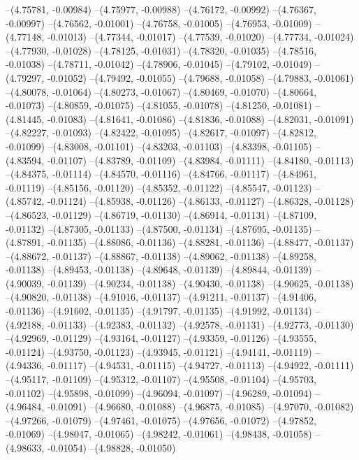 --(4.75781, -0.00984)
--(4.75977, -0.00988)
--(4.76172, -0.00992)
--(4.76367, -0.00997)
--(4.76562, -0.01001)
--(4.76758, -0.01005)
--(4.76953, -0.01009)
--(4.77148, -0.01013)
--(4.77344, -0.01017)
--(4.77539, -0.01020)
--(4.77734, -0.01024)
--(4.77930, -0.01028)
--(4.78125, -0.01031)
--(4.78320, -0.01035)
--(4.78516, -0.01038)
--(4.78711, -0.01042)
--(4.78906, -0.01045)
--(4.79102, -0.01049)
--(4.79297, -0.01052)
--(4.79492, -0.01055)
--(4.79688, -0.01058)
--(4.79883, -0.01061)
--(4.80078, -0.01064)
--(4.80273, -0.01067)
--(4.80469, -0.01070)
--(4.80664, -0.01073)
--(4.80859, -0.01075)
--(4.81055, -0.01078)
--(4.81250, -0.01081)
--(4.81445, -0.01083)
--(4.81641, -0.01086)
--(4.81836, -0.01088)
--(4.82031, -0.01091)
--(4.82227, -0.01093)
--(4.82422, -0.01095)
--(4.82617, -0.01097)
--(4.82812, -0.01099)
--(4.83008, -0.01101)
--(4.83203, -0.01103)
--(4.83398, -0.01105)
--(4.83594, -0.01107)
--(4.83789, -0.01109)
--(4.83984, -0.01111)
--(4.84180, -0.01113)
--(4.84375, -0.01114)
--(4.84570, -0.01116)
--(4.84766, -0.01117)
--(4.84961, -0.01119)
--(4.85156, -0.01120)
--(4.85352, -0.01122)
--(4.85547, -0.01123)
--(4.85742, -0.01124)
--(4.85938, -0.01126)
--(4.86133, -0.01127)
--(4.86328, -0.01128)
--(4.86523, -0.01129)
--(4.86719, -0.01130)
--(4.86914, -0.01131)
--(4.87109, -0.01132)
--(4.87305, -0.01133)
--(4.87500, -0.01134)
--(4.87695, -0.01135)
--(4.87891, -0.01135)
--(4.88086, -0.01136)
--(4.88281, -0.01136)
--(4.88477, -0.01137)
--(4.88672, -0.01137)
--(4.88867, -0.01138)
--(4.89062, -0.01138)
--(4.89258, -0.01138)
--(4.89453, -0.01138)
--(4.89648, -0.01139)
--(4.89844, -0.01139)
--(4.90039, -0.01139)
--(4.90234, -0.01138)
--(4.90430, -0.01138)
--(4.90625, -0.01138)
--(4.90820, -0.01138)
--(4.91016, -0.01137)
--(4.91211, -0.01137)
--(4.91406, -0.01136)
--(4.91602, -0.01135)
--(4.91797, -0.01135)
--(4.91992, -0.01134)
--(4.92188, -0.01133)
--(4.92383, -0.01132)
--(4.92578, -0.01131)
--(4.92773, -0.01130)
--(4.92969, -0.01129)
--(4.93164, -0.01127)
--(4.93359, -0.01126)
--(4.93555, -0.01124)
--(4.93750, -0.01123)
--(4.93945, -0.01121)
--(4.94141, -0.01119)
--(4.94336, -0.01117)
--(4.94531, -0.01115)
--(4.94727, -0.01113)
--(4.94922, -0.01111)
--(4.95117, -0.01109)
--(4.95312, -0.01107)
--(4.95508, -0.01104)
--(4.95703, -0.01102)
--(4.95898, -0.01099)
--(4.96094, -0.01097)
--(4.96289, -0.01094)
--(4.96484, -0.01091)
--(4.96680, -0.01088)
--(4.96875, -0.01085)
--(4.97070, -0.01082)
--(4.97266, -0.01079)
--(4.97461, -0.01075)
--(4.97656, -0.01072)
--(4.97852, -0.01069)
--(4.98047, -0.01065)
--(4.98242, -0.01061)
--(4.98438, -0.01058)
--(4.98633, -0.01054)
--(4.98828, -0.01050)
